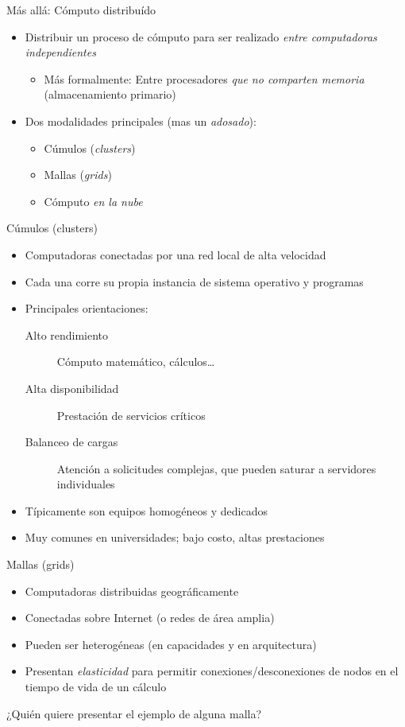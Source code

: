 \documentclass[presentation]{beamer}
\begin{document}
\begin{frame}[label={sec:org27a3ea3}]{Más allá: Cómputo distribuído}
\begin{itemize}
\item Distribuir un proceso de cómputo para ser realizado \emph{entre
computadoras independientes}
\begin{itemize}
\item Más formalmente: Entre procesadores \emph{que no comparten memoria}
(almacenamiento primario)
\end{itemize}
\item Dos modalidades principales (mas un \emph{adosado}):
\begin{itemize}
\item Cúmulos (\emph{clusters})
\item Mallas (\emph{grids})
\item Cómputo \emph{en la nube}
\end{itemize}
\end{itemize}
\end{frame}

\begin{frame}[label={sec:orgea4f4d6}]{Cúmulos (clusters)}
\begin{itemize}
\item Computadoras conectadas por una red local de alta velocidad
\item Cada una corre su propia instancia de sistema operativo y programas
\item Principales orientaciones:
\begin{description}
\item[{Alto rendimiento}] Cómputo matemático, cálculos\ldots{}
\item[{Alta disponibilidad}] Prestación de servicios críticos
\item[{Balanceo de cargas}] Atención a solicitudes complejas, que pueden
saturar a servidores individuales
\end{description}
\item Típicamente son equipos homogéneos y dedicados
\item Muy comunes en universidades; bajo costo, altas prestaciones
\end{itemize}
\end{frame}

\begin{frame}[label={sec:org55ae72a}]{Mallas (grids)}
\begin{itemize}
\item Computadoras distribuidas geográficamente
\item Conectadas sobre Internet (o redes de área amplia)
\item Pueden ser heterogéneas (en capacidades y en arquitectura)
\item Presentan \emph{elasticidad} para permitir conexiones/desconexiones de
nodos en el tiempo de vida de un cálculo
\end{itemize}
\pause
\begin{center}
¿Quién quiere presentar el ejemplo de alguna malla?
\end{center}
\end{frame}
\end{document}
